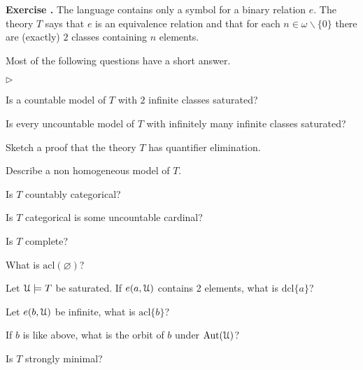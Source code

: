 \documentclass[10pt]{article}
\def\U{\EuScript U}
\def\sm{\smallsetminus}
\def\Aut{\textrm{Aut}}
\def\acl{\textrm{acl}}
\def\dcl{\textrm{dcl}}
\newcommand{\labella}[1]{{\sf\footnotesize #1}\hfill}
\renewenvironment{itemize}
  {\begin{list}{$\triangleright$}{%
   \setlength{\parskip}{0mm}
   \setlength{\topsep}{0mm}
   \setlength{\rightmargin}{0mm}
   \setlength{\listparindent}{0mm}
   \setlength{\itemindent}{0mm}
   \setlength{\labelwidth}{3ex}
   \setlength{\itemsep}{0mm}
   \setlength{\parsep}{0mm}
   \setlength{\partopsep}{0mm}
   \setlength{\labelsep}{1ex}
   \setlength{\leftmargin}{\labelwidth+\labelsep}
   \let\makelabel\labella}}{%
   \end{list}}
\newcounter{ex}
\newenvironment{exercise}{\bigskip\addtocounter{ex}{1}\textbf{Exercise \theex.\quad}}{}
\begin{document}
\begin{exercise}
The language contains only a symbol for a binary relation $e$. The theory $T$ says that $e$ is an equivalence relation and that for each $n\in\omega\sm\{0\}$ there are (exactly) $2$ classes containing $n$ elements. 

Most of the following questions have a short answer.

\medskip
\begin{itemize}
\item[1.] Is a countable model of $T$ with $2$ infinite classes saturated?
\item[2.] Is every uncountable model of $T$ with infinitely many infinite classes saturated?
\item[3.] Sketch a proof that the theory $T$ has quantifier elimination.
\item[4.] Describe a non homogeneous model of $T$.  
\item[5.] Is $T$ countably categorical? 
\item[6.] Is $T$ categorical is some uncountable cardinal?
\item[7.] Is $T$ complete?
\item[8.] What is $\acl(\varnothing)$?
\item[9.] Let $\U\models T$ be saturated. If $e(a,\U)$ contains 2 elements, what is $\dcl\{a\}$?
\item[10.] Let $e(b,\U)$ be infinite, what is $\acl\{b\}$?
\item[11.] If $b$ is like above, what is the orbit of $b$ under $\Aut(\U)$?
\item[12.] Is $T$ strongly minimal?
\end{itemize}
\end{exercise}
\end{document}
